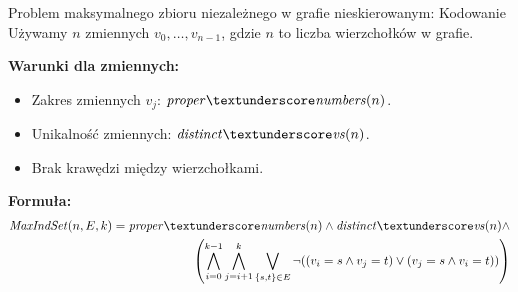 \begin{frame}{Problem maksymalnego zbioru niezależnego w grafie nieskierowanym: Kodowanie}
Używamy $n$ zmiennych $v_0,…,v_{n−1}$, gdzie $n$ to liczba wierzchołków w grafie.
\vspace{10pt}

\textbf{Warunki dla zmiennych:}
\vspace{5pt}
\begin{itemize}
	\item Zakres zmiennych $v_j$: $\propernumbers(n)$.
	\item Unikalność zmiennych: $\distinctvs(n)$.
	\item Brak krawędzi między wierzchołkami.
\end{itemize}
\vspace{10pt}
\textbf{Formuła:}
\begin{align*}
	\MaxIndSet(n, E, k) = \propernumbers(n) \land \distinctvs(n)  \land \\
	\left( \bigwedge_{i=0}^{k-1} \bigwedge_{j=i+1}^{k} \bigvee_{\{s,t\} \in E} \lnot((v_i = s \land v_j = t) \lor (v_j = s \land v_i = t)) \right)	
\end{align*}
\end{frame}
	